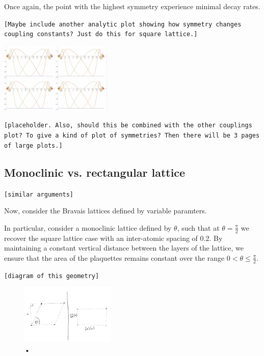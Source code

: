 \documentclass[aps,pra,superscriptaddress,twocolumn]{revtex4-1}
\newcommand{\commentSB}[1]{\texttt{\color{blue}[#1]}}
\newcommand{\commentSO}[1]{\texttt{\color{orange}[#1]}}
\begin{document}
Once again, the point with the highest symmetry experience minimal decay rates.


\commentSB{Maybe include another analytic plot showing how symmetry changes coupling constants? Just do this for square lattice.}

\includegraphics[width=0.4\textwidth]{figures/triangle_and_square_substitution_coupling.png}

\commentSB{placeholder. Also, should this be combined with the other couplings plot? To give a kind of plot of symmetries? Then there will be 3 pages of large plots.}

\subsection{Monoclinic vs. rectangular lattice}
\commentSO{similar arguments}

Now, consider the Bravais lattices defined by variable paramters. 

In particular, consider a monoclinic lattice defined by $\theta$, such that at $\theta = \frac{\pi}{2}$ we recover the square lattice case with an inter-atomic spacing of $0.2$. By maintaining a constant vertical distance between the layers of the lattice, we ensure that the area of the plaquettes remains constant over the range $ 0 < \theta \leq \frac{\pi}{2}$. 

\commentSB{diagram of this geometry}

\begin{figure}
    \centering
    \includegraphics[width=0.4\textwidth]{figures/mono_rect_geo.png} 
    \caption{•}
    \label{fig:mono_rect_geo}
\end{figure}
\end{document}
